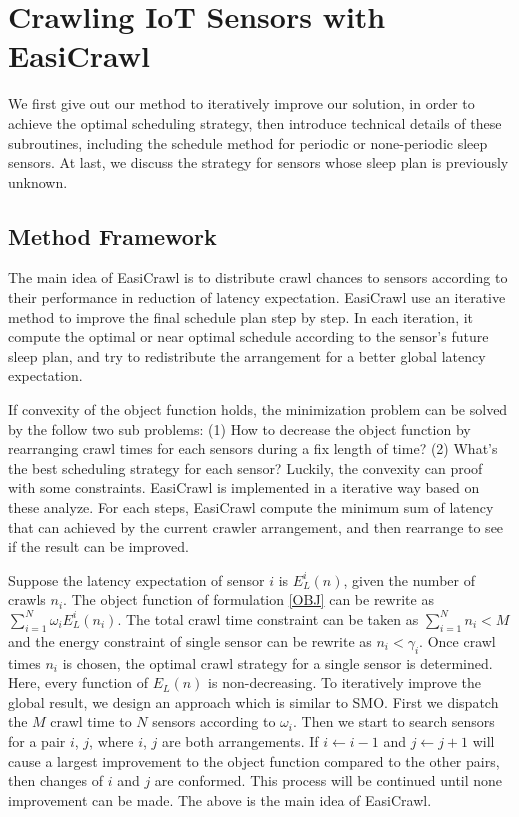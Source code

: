 \documentclass[conference]{IEEEtran}
\begin{document}
\section{Crawling IoT Sensors with EasiCrawl} \label{easicrawl}

We first give out our method to iteratively improve our solution, in order to achieve the optimal scheduling strategy, then introduce technical details of these subroutines, including the schedule method for periodic or none-periodic sleep sensors. At last, we discuss the strategy for sensors whose sleep plan is previously unknown.

\subsection{Method Framework}
The main idea of EasiCrawl is to distribute crawl chances to sensors according to their performance in reduction of latency expectation.
EasiCrawl use an iterative method to improve the final schedule plan step by step. 
In each iteration, it compute the optimal or near optimal schedule according to the sensor's future sleep plan, and try to redistribute the arrangement for a better global latency expectation.


If convexity of the object function holds, the minimization problem can be solved by the follow two sub problems: 
(1) How to decrease the object function by rearranging crawl times for each sensors during a fix length of time? 
(2) What's the best scheduling strategy for each sensor? Luckily, the convexity can proof with some constraints. EasiCrawl is implemented in a iterative way based on these analyze. For each steps, EasiCrawl compute the minimum sum of latency that can achieved by the current crawler arrangement, and then rearrange to see if the result can be improved.

Suppose the latency expectation of sensor $i$ is $E_L^{i}(n)$, given the number of crawls $n_i$.
The object function of formulation \ref{OBJ} can be rewrite as $\sum_{i=1}^{N} \omega_i E_L^{i}(n_i)$. The total crawl time constraint can be taken as $\sum_{i=1}^{N} n_i < M$ and the energy constraint of single sensor can be rewrite as $n_i<\gamma_i$.
Once crawl times $n_i$ is chosen, the optimal crawl strategy for a single sensor is determined. Here, every function of $E_L(n)$ is non-decreasing. 
To iteratively improve the global result, we design an approach which is similar to SMO\cite{Platt1998}. 
First we dispatch the $M$ crawl time to $N$ sensors according to $\omega_i$. Then we start to search sensors for a pair $i$, $j$, where $i$, $j$ are both arrangements. If $i\gets i-1$ and $j\gets j+1$ will cause a largest improvement to the object function compared to the other pairs, then changes of $i$ and $j$ are conformed. This process will be continued until none improvement can be made. 
The above is the main idea of EasiCrawl.
\end{document}
